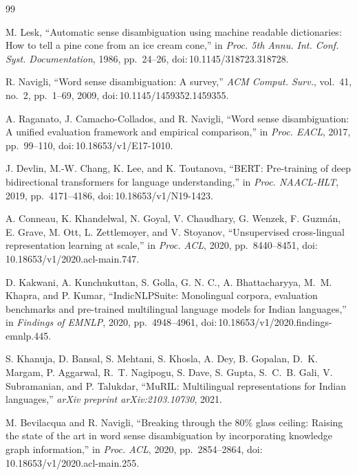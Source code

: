 \documentclass{ieeeaccess}
\begin{document}
\begin{thebibliography}{99}

M. Lesk, ``Automatic sense disambiguation using machine readable dictionaries:
How to tell a pine cone from an ice cream cone,'' in
\emph{Proc. 5th Annu. Int. Conf. Syst. Documentation}, 1986,
pp.~24--26, doi:\,10.1145/318723.318728.

R. Navigli, ``Word sense disambiguation: A survey,''
\emph{ACM Comput. Surv.}, vol.~41, no.~2, pp.~1--69, 2009,
doi:\,10.1145/1459352.1459355.

A. Raganato, J. Camacho-Collados, and R. Navigli, ``Word sense disambiguation:
A unified evaluation framework and empirical comparison,'' in
\emph{Proc. EACL}, 2017, pp.~99--110, doi:\,10.18653/v1/E17-1010.

J. Devlin, M.-W. Chang, K. Lee, and K. Toutanova, ``BERT: Pre-training of
deep bidirectional transformers for language understanding,'' in
\emph{Proc. NAACL-HLT}, 2019, pp.~4171--4186, doi:\,10.18653/v1/N19-1423.

A. Conneau, K. Khandelwal, N. Goyal, V. Chaudhary, G. Wenzek,
F. Guzm\'{a}n, E. Grave, M. Ott, L. Zettlemoyer, and V. Stoyanov,
``Unsupervised cross-lingual representation learning at scale,'' in
\emph{Proc. ACL}, 2020, pp.~8440--8451, doi:\,10.18653/v1/2020.acl-main.747.

D. Kakwani, A. Kunchukuttan, S. Golla, G. N. C., A. Bhattacharyya,
M.~M. Khapra, and P. Kumar, ``IndicNLPSuite: Monolingual corpora, evaluation
benchmarks and pre-trained multilingual language models for Indian languages,''
in \emph{Findings of EMNLP}, 2020, pp.~4948--4961,
doi:\,10.18653/v1/2020.findings-emnlp.445.

S. Khanuja, D. Bansal, S. Mehtani, S. Khosla, A. Dey, B. Gopalan,
D.~K. Margam, P. Aggarwal, R.~T. Nagipogu, S. Dave, S. Gupta,
S.~C.~B. Gali, V. Subramanian, and P. Talukdar, ``MuRIL: Multilingual
representations for Indian languages,'' \emph{arXiv preprint
arXiv:2103.10730}, 2021.

M. Bevilacqua and R. Navigli, ``Breaking through the 80\% glass ceiling:
Raising the state of the art in word sense disambiguation by incorporating
knowledge graph information,'' in \emph{Proc. ACL}, 2020, pp.~2854--2864,
doi:\,10.18653/v1/2020.acl-main.255.


\end{thebibliography}
\end{document}
